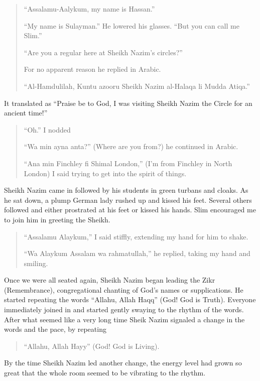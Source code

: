 \documentclass[12pt]{memoir}
\def\–{-\hskip0pt}
\begin{document}
\begin{quote}
“Assalamu-Aalykum, my name is Hassan.”

“My name is Sulayman.” He lowered his glasses.
“But you can call me Slim.”

“Are you a regular here at Sheikh Nazim’s circles?”

For no apparent reason he replied in Arabic.

“Al-Hamdulilah, Kuntu azooru Sheikh Nazim al\–Halaqa li Mudda Atiqa.”
\end{quote}

It translated as “Praise be to God,
I was visiting Sheikh Nazim the Circle for an ancient time!”

\begin{quote}
“Oh.” I nodded

“Wa min ayna anta?” (Where are you from?) he continued in Arabic.

“Ana min Finchley fi Shimal London,”
(I’m from Finchley in North London)
I said trying to get into the spirit of things.
\end{quote}

Sheikh Nazim came in followed by his students in green turbans and cloaks.
As he sat down, a plump German lady rushed up and kissed his feet.
Several others followed and either prostrated at his feet or kissed his hands.
Slim encouraged me to join him in greeting the Sheikh.

\begin{quote}
“Assalamu Alaykum,” I said stiffly, extending my hand for him to shake.

“Wa Alaykum Assalam wa rahmatullah,” he replied, taking my hand and smiling.
\end{quote}

Once we were all seated again,
Sheikh Nazim began leading the Zikr (Remembrance),
congregational chanting of God’s names or supplications.
He started repeating the words “Allahu, Allah Haqq” (God! God is Truth).
Everyone immediately joined in
and started gently swaying to the rhythm of the words.
After what seemed like a very long time Sheik Nazim signaled a change
in the words and the pace, by repeating

\begin{quote}
“Allahu, Allah Hayy” (God! God is Living).
\end{quote}

By the time Sheikh Nazim led another change,
the energy level had grown so great
that the whole room seemed to be vibrating to the rhythm.
\end{document}
